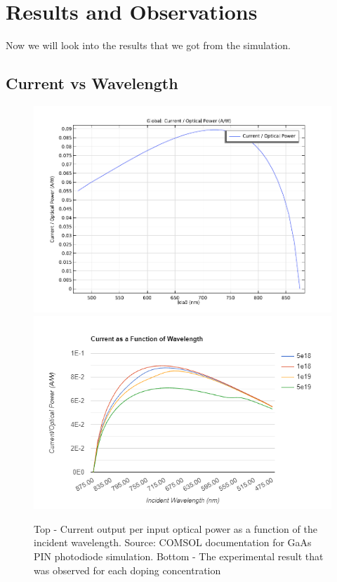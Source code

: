 \documentclass[conference]{IEEEtran}
\begin{document}
\section{Results and Observations}
Now we will look into the results that we got from the simulation.

\subsection{Current vs Wavelength}

\begin{figure}
\begin{center}
\includegraphics[scale = 0.3]{Current.png}
\includegraphics[scale = 0.4]{Current as f(W).png}
\caption{Top - Current output per input optical power as a function of the incident wavelength. Source: COMSOL documentation for GaAs PIN photodiode simulation. Bottom - The experimental result that was observed for each doping concentration}
\end{center}
\end{figure}
\end{document}
